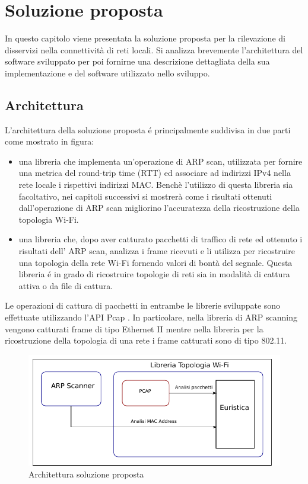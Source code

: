 \chapter{Soluzione proposta}
In questo capitolo viene presentata la soluzione proposta per la rilevazione di disservizi nella connettivit\`a di reti locali.
Si analizza brevemente l'architettura del software sviluppato per poi fornirne una descrizione dettagliata della sua implementazione e del software utilizzato nello sviluppo.

\section{Architettura}
L'architettura della soluzione proposta \'e principalmente suddivisa in due parti come mostrato in figura: %
\begin{itemize}

\item una libreria che implementa un'operazione di ARP \cite{rfc826} scan, utilizzata per fornire una metrica del round-trip time (RTT) ed associare ad indirizzi IPv4 nella rete locale i rispettivi indirizzi MAC.
Bench\`e l'utilizzo di questa libreria sia facoltativo, nei capitoli successivi si mostrer\`a come i risultati ottenuti dall'operazione di ARP scan migliorino l'accuratezza della ricostruzione della topologia Wi-Fi.
\item una libreria che, dopo aver catturato pacchetti di traffico di rete ed ottenuto i risultati dell' ARP scan, analizza i frame ricevuti e li utilizza per ricostruire una topologia della rete Wi-Fi fornendo valori di bont\`a del segnale.
Questa libreria \'e in grado di ricostruire topologie di reti sia in modalit\`a di cattura attiva o da file di cattura.
\end{itemize}

Le operazioni di cattura di pacchetti in entrambe le librerie sviluppate sono effettuate utilizzando l'API Pcap \cite{pcap}.
In particolare, nella libreria di ARP scanning vengono catturati frame di tipo Ethernet II mentre nella libreria per la ricostruzione della topologia di una rete i frame catturati sono di tipo 802.11.

\begin{figure}[!htb]
	\centering
	\includegraphics{images/img4.pdf}
	\caption{Architettura soluzione proposta}
	\label{fig:solproposta}
\end{figure}


